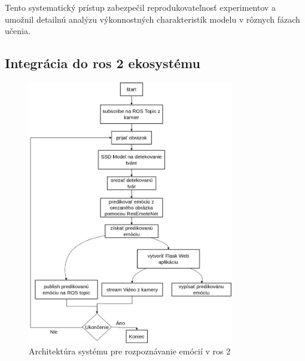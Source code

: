 Tento systematický prístup zabezpečil reprodukovateľnosť experimentov a umožnil detailnú analýzu výkonnostných charakteristík modelu v rôznych fázach učenia.
\newpage
\subsection{Integrácia do \gls{ros} 2 ekosystému}

\begin{figure}[!htpb]
    \centering
    \includegraphics[width=0.8\textwidth]{img/predikovanie_diagram.png}
    \caption{Architektúra systému pre rozpoznávanie emócií v \gls{ros} 2}
    \label{fig:ros2_architecture}
\end{figure}


